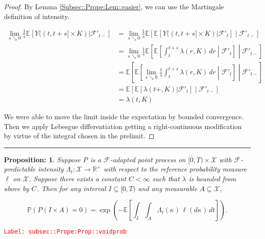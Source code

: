 \documentclass[12pt]{article}
\newcommand{\mb}{\mathbb}
\newcommand{\mc}{\mathcal}
\newcommand{\ra}{\rightarrow}
\newcommand{\tr}{\textcolor{red}}
\newcommand{\labe}[1]{\tr{\texttt{Label: #1}}}
\newcommand{\lin}{\rule{\linewidth}{0.4 pt}}
\newcommand{\pr}{\mb{P}}							%
\newcommand{\ex}[1]{\mb{E}\left[#1\right]}			%
\renewcommand{\S}{S}							%
\newcommand{\T}{T}								%
\renewcommand{\t}{t}							%
\newcommand{\rp}[1]{P^{#1}}							%
\newcommand{\rate}[1]{\lambda_{#1}}					%
\newcommand{\ratee}[1]{\Lambda_{#1}}				%
\newcommand{\F}[2]{\mc{F}_{#1}^{#2}}				%
\newcommand{\const}[1]{C_{#1}}						%
\newcommand{\Sm}{\ell}								%
\newcommand{\typset}{A}							%
\renewcommand{\mark}[1]{\kappa^{#1}}				%
\newcommand{\spce}{\mc{X}}						%
\newtheorem{prop}[thms]{Proposition: }
\begin{document}
\begin{proof}
By Lemma \ref{Subsec::Prope:Lem::easier}, we can use the Martingale definition of intensity.

\begin{align*}
\lim_{s\searrow 0}\frac{1}{s}\ex{Y((t,t+s]\times K)|\mc{F}'_{t-}}& = \lim_{s\searrow 0}\frac{1}{s}\ex{\ex{Y((t,t+s]\times K)|\mc{F}'_t}\middle|\mc{F}'_{t-}}\\
&= \lim_{s\searrow 0}\frac{1}{s}\ex{\ex{\int_t^{t+s} \lambda(r,K)\,dr\middle|\mc{F}'_t}\middle|\mc{F}'_{t-}}\\
&= \ex{\ex{\lim_{s \searrow 0} \frac{1}{s}\int_t^{t+s} \lambda(r,K)\,dr\middle|\mc{F}'_t}\middle|\mc{F}'_{t-}}\\
&=\ex{\ex{\lambda(t+,K)|\mc{F}'_t}\middle|\mc{F}'_{t-}}\\
&=\lambda(t,K)
\end{align*}

We were able to move the limit inside the expectation by bounded convergence. Then we apply Lebesgue differentiation getting a right-continuous modification by virtue of the integral chosen in the prelimit.
\end{proof}

\lin

\begin{prop}
Suppose \(\rp{}\) is a \(\F{}{}\)-adapted point process on \([0,\T)\times \spce\) with \(\F{}{}\)-predictable intensity \(\ratee{\t}:\spce \ra\mb{R}^+\) with respect to the reference probability measure \(\Sm\) on \(\spce\). Suppose there exists a constant \(\const{} < \infty\) such that \(\rate{}\) is bounded from above by \(\const{}\). Then for any interval \(I \subseteq [0,\T)\) and any measurable \(\typset \subseteq \spce\),

\[\pr(\rp{}(I\times\typset) = 0) = \exp\left(-\ex{\int_I\int_\typset \ratee{\t}(\mark{})\,\Sm(d\mark{})\,d\t}\right).\]
\label{subsec::Prope:Prop::voidprob}
\end{prop}
\labe{subsec::Prope:Prop::voidprob}
\end{document}
